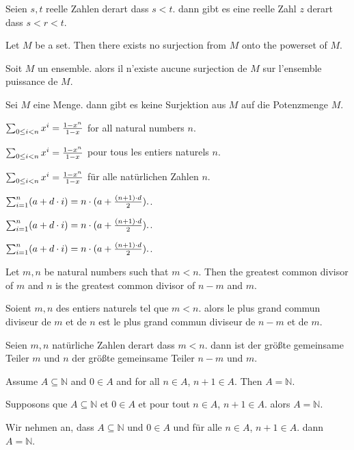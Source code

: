 \documentclass{article}
\begin{document}
Seien $ s, t $ reelle Zahlen derart dass $ s < t $. dann gibt es eine reelle Zahl $ z $ derart dass $ s < r < t $.


Let $ M $ be a set. Then there exists no surjection from $ M $ onto the powerset of $ M $.

Soit $ M $ un ensemble. alors il n'existe aucune surjection de $ M $ sur l'ensemble puissance de $ M $.

Sei $ M $ eine Menge. dann gibt es keine Surjektion aus $ M $ auf die Potenzmenge $ M $.


$ \sumgeom{x}{n} = \frac{1 - x^{n}}{1 - x} $ for all natural numbers $ n $.

$ \sumgeom{x}{n} = \frac{1 - x^{n}}{1 - x} $ pour tous les entiers naturels $ n $.

$ \sumgeom{x}{n} = \frac{1 - x^{n}}{1 - x} $ für alle natürlichen Zahlen $ n $.


$ \sumarith{a}{d}{n} = n \cdot ( a + \frac{(n + 1) \cdot d}{2}). $.

$ \sumarith{a}{d}{n} = n \cdot ( a + \frac{(n + 1) \cdot d}{2}). $.

$ \sumarith{a}{d}{n} = n \cdot ( a + \frac{(n + 1) \cdot d}{2}). $.


Let $ m, n $ be natural numbers such that $ m < n $. Then the greatest common divisor of $ m $ and $ n $ is the greatest common divisor of $ n-m $ and $ m $.

Soient $ m, n $ des entiers naturels tel que $ m < n $. alors le plus grand commun diviseur de $ m $ et de $ n $ est le plus grand commun diviseur de $ n-m $ et de $ m $.

Seien $ m, n $ natürliche Zahlen derart dass $ m < n $. dann ist der größte gemeinsame Teiler $ m $ und $ n $ der größte gemeinsame Teiler $ n-m $ und $ m $.


Assume $ A \subseteq \mathbb{N} $ and $ 0 \in A $ and for all $ n \in A $, $ n + 1 \in A $. Then $ A = \mathbb{N} $.

Supposons que $ A \subseteq \mathbb{N} $ et $ 0 \in A $ et pour tout $ n \in A $, $ n + 1 \in A $. alors $ A = \mathbb{N} $.

Wir nehmen an, dass $ A \subseteq \mathbb{N} $ und $ 0 \in A $ und für alle $ n \in A $, $ n + 1 \in A $. dann $ A = \mathbb{N} $.
\end{document}
